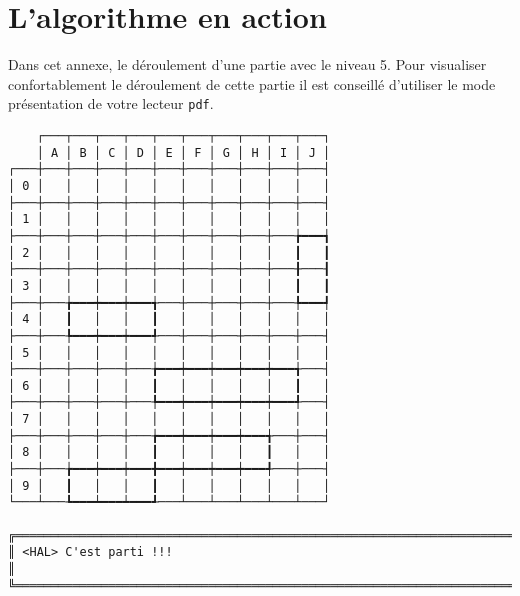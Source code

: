 \chapter{L'algorithme en action} \label{annexe_algo_action}
Dans cet annexe, le déroulement d'une partie avec le niveau 5. Pour visualiser confortablement le déroulement de cette partie il est conseillé d'utiliser le mode présentation de votre lecteur \texttt{pdf}.

{\scriptsize
\begin{verbatim}
    ┌───┬───┬───┬───┬───┬───┬───┬───┬───┬───┐
    │ A │ B │ C │ D │ E │ F │ G │ H │ I │ J │
┌───┼───┼───┼───┼───┼───┼───┼───┼───┼───┼───┤
│ 0 │   │   │   │   │   │   │   │   │   │   │
├───┼───┼───┼───┼───┼───┼───┼───┼───┼───┼───┤
│ 1 │   │   │   │   │   │   │   │   │   │   │
├───┼───┼───┼───┼───┼───┼───┼───┼───┼───╆━━━┪
│ 2 │   │   │   │   │   │   │   │   │   ┃   ┃
├───┼───┼───┼───┼───┼───┼───┼───┼───┼───╂───┨
│ 3 │   │   │   │   │   │   │   │   │   ┃   ┃
├───┼───╆━━━┿━━━┿━━━╅───┼───┼───┼───┼───╄━━━┩
│ 4 │   ┃   │   │   ┃   │   │   │   │   │   │
├───┼───╄━━━┿━━━┿━━━╃───┼───┼───┼───┼───┼───┤
│ 5 │   │   │   │   │   │   │   │   │   │   │
├───┼───┼───┼───┼───╆━━━┿━━━┿━━━┿━━━┿━━━╅───┤
│ 6 │   │   │   │   ┃   │   │   │   │   ┃   │
├───┼───┼───┼───┼───╄━━━┿━━━┿━━━┿━━━┿━━━╃───┤
│ 7 │   │   │   │   │   │   │   │   │   │   │
├───┼───┼───┼───┼───╆━━━┿━━━┿━━━┿━━━╅───┼───┤
│ 8 │   │   │   │   ┃   │   │   │   ┃   │   │
├───┼───╆━━━┿━━━┿━━━╋━━━┿━━━┿━━━┿━━━╃───┼───┤
│ 9 │   ┃   │   │   ┃   │   │   │   │   │   │
└───┴───┺━━━┷━━━┷━━━┹───┴───┴───┴───┴───┴───┘

╔══════════════════════════════════════════════════════════════════════════════════════════════════╗
║ <HAL> C'est parti !!!                                                                            ║
╚══════════════════════════════════════════════════════════════════════════════════════════════════╝
\end{verbatim}}
\newpage

